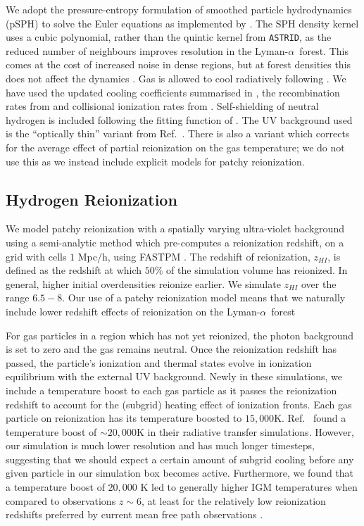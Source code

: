 \documentclass[a4paper,11pt]{article}
\newcommand{\Lya}{Lyman-$\alpha$}
\newcommand{\astrid}{\texttt{ASTRID}}
\begin{document}
We adopt the pressure-entropy formulation of smoothed particle hydrodynamics (pSPH) to solve the Euler equations \citep{Hopkins:2013,Read:2010} as implemented by \cite{Feng:2014}. %
The SPH density kernel uses a cubic polynomial, rather than the quintic kernel from \astrid, as the reduced number of neighbours improves resolution in the \Lya~forest. This comes at the cost of increased noise in dense regions, but at forest densities this does not affect the dynamics \cite{Bird:2013}.
Gas is allowed to cool radiatively following \citep{Katz:1996}.
We have used the updated cooling coefficients summarised in \cite{Bolton:2017}, the recombination rates from \cite{Verner:1996} and collisional ionization rates from \cite{Voronov:1997}. Self-shielding of neutral hydrogen is included following the fitting function of \cite{Rahmati:2013}.
The UV background used is the ``optically thin'' variant from Ref.~\cite{FG2020}. There is also a variant which corrects for the average effect of partial reionization on the gas temperature; we do not use this as we instead include explicit models for patchy reionization.

\subsection{Hydrogen Reionization}
\label{sec:hydrogen}

We model patchy reionization with a spatially varying ultra-violet background using a semi-analytic method \cite{Battaglia:2013} which pre-computes a reionization redshift, on a grid with cells $1$ Mpc/h, using FASTPM \cite{FASTPM}. The redshift of reionization, $z_{HI}$, is defined as the redshift at which $50\%$ of the simulation volume has reionized. In general, higher initial overdensities reionize earlier. We simulate $z_{HI}$ over the range $6.5 - 8$. Our use of a patchy reionization model means that we naturally include lower redshift effects of reionization on the \Lya~forest \citep{Montero:2019}

For gas particles in a region which has not yet reionized, the photon background is set to zero and the gas remains neutral. Once the reionization redshift has passed, the particle's ionization and thermal states evolve in ionization equilibrium with the external UV background. Newly in these simulations, we include a temperature boost to each gas particle as it passes the reionization redshift to account for the (subgrid) heating effect of ionization fronts.
Each gas particle on reionization has its temperature boosted to $15,000$K.
Ref.~\citep{DAloisio:2019} found a temperature boost of $\sim 20,000$K in their radiative transfer simulations. However, our simulation is much lower resolution and has much longer timesteps, suggesting that we should expect a certain amount of subgrid cooling before any given particle in our simulation box becomes active. Furthermore, we found that a temperature boost of $20,000$ K led to generally higher IGM temperatures when compared to observations $z\sim 6$, at least for the relatively low reionization redshifts preferred by current mean free path observations \cite{Cain:2021}.
\end{document}
